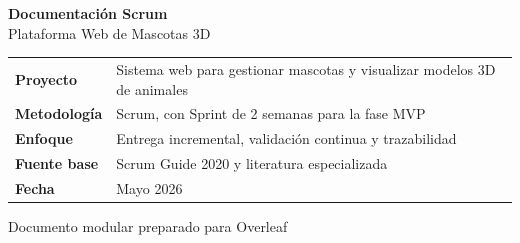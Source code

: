 \documentclass[12pt,a4paper]{article}
\author{Equipo del Proyecto}
\date{Mayo 2026}
\begin{document}
\begin{titlepage}
\centering
\vspace*{1.8cm}
{\Huge\bfseries\color{PrimaryBlue} Documentaci\'on Scrum\\[0.35em]}
{\LARGE Plataforma Web de Mascotas 3D\\[1.2cm]}

\begin{tabular}{p{5cm} p{8cm}}
\rowcolor{SoftGray}
\textbf{Proyecto} & Sistema web para gestionar mascotas y visualizar modelos 3D de animales \\
\textbf{Metodolog\'ia} & Scrum, con Sprint de 2 semanas para la fase MVP \\
\textbf{Enfoque} & Entrega incremental, validaci\'on continua y trazabilidad \\
\textbf{Fuente base} & Scrum Guide 2020 y literatura especializada \\
\textbf{Fecha} & Mayo 2026 \\
\end{tabular}

\vfill
{\large Documento modular preparado para Overleaf}
\end{titlepage}

\tableofcontents
\newpage








\newpage


\end{document}
